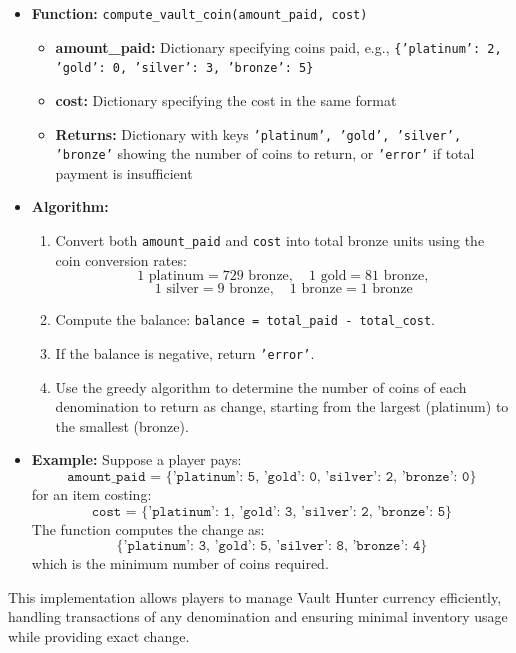 \documentclass[12pt,a4paper]{report}
\begin{document}
\begin{itemize}
    \item \textbf{Function:} \texttt{compute\_vault\_coin(amount\_paid, cost)}
    \begin{itemize}
        \item \textbf{amount\_paid:} Dictionary specifying coins paid, e.g.,
        \texttt{\{'platinum': 2, 'gold': 0, 'silver': 3, 'bronze': 5\}}
        \item \textbf{cost:} Dictionary specifying the cost in the same format
        \item \textbf{Returns:} Dictionary with keys \texttt{'platinum', 'gold', 'silver', 'bronze'} showing the number of coins to return, or \texttt{'error'} if total payment is insufficient
    \end{itemize}
    \item \textbf{Algorithm:}
    \begin{enumerate}
        \item Convert both \texttt{amount\_paid} and \texttt{cost} into total bronze units using the coin conversion rates:
         \[
        1 \text{ platinum} = 729 \text{ bronze}, \quad
        1 \text{ gold} = 81 \text{ bronze},
        \]
        \[
        1 \text{ silver} = 9 \text{ bronze}, \quad
        1 \text{ bronze} = 1 \text{ bronze}
        \]
        \item Compute the balance: \texttt{balance = total\_paid - total\_cost}.
        \item If the balance is negative, return \texttt{'error'}.
        \item Use the greedy algorithm to determine the number of coins of each denomination to return as change, starting from the largest (platinum) to the smallest (bronze).
    \end{enumerate}
    \item \textbf{Example:}  
    Suppose a player pays:
    \[
    \texttt{amount\_paid = \{'platinum': 5, 'gold': 0, 'silver': 2, 'bronze': 0\}}
    \]  
    for an item costing:
    \[
    \texttt{cost = \{'platinum': 1, 'gold': 3, 'silver': 2, 'bronze': 5\}}
    \]  
    The function computes the change as:
    \[
    \texttt{\{'platinum': 3, 'gold': 5, 'silver': 8, 'bronze': 4\}}
    \]  
    which is the minimum number of coins required.
\end{itemize}

This implementation allows players to manage Vault Hunter currency efficiently, handling transactions of any denomination and ensuring minimal inventory usage while providing exact change.
\end{document}

